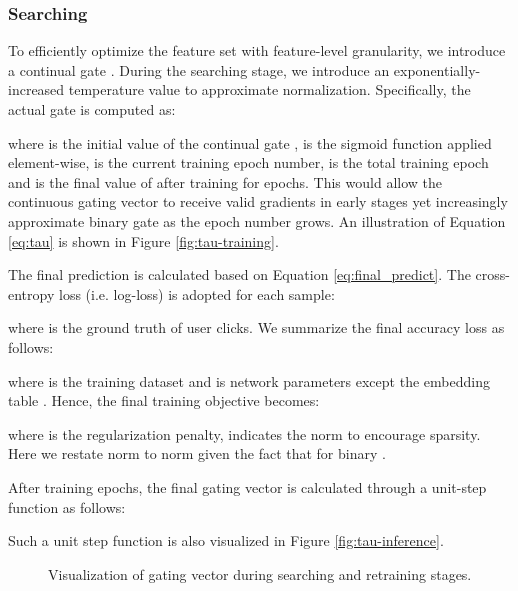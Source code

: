 \documentclass[sigconf]{acmart}
\begin{document}
\subsubsection{Searching}
To efficiently optimize the feature set with feature-level granularity, we introduce a continual gate . During the searching stage, we introduce an exponentially-increased temperature value  to approximate  normalization. Specifically, the actual gate  is computed as:

where  is the initial value of the continual gate ,  is the sigmoid function  applied element-wise,  is the current training epoch number,  is the total training epoch and  is the final value of  after training for  epochs. This would allow the continuous gating vector  to receive valid gradients in early stages yet increasingly approximate binary gate as the epoch number  grows. An illustration of Equation \ref{eq:tau} is shown in Figure \ref{fig:tau-training}.

The final prediction is calculated based on Equation \ref{eq:final_predict}. The cross-entropy loss (i.e. log-loss) is adopted for each sample:

where  is the ground truth of user clicks. We summarize the final accuracy loss as follows:

where  is the training dataset and  is network parameters except the embedding table . Hence, the final training objective becomes:

where  is the regularization penalty,  indicates the  norm to encourage sparsity. Here we restate  norm to  norm given the fact that  for binary .

After training  epochs, the final gating vector  is calculated through a unit-step function as follows:

Such a unit step function is also visualized in Figure \ref{fig:tau-inference}.

\begin{figure}[!htbp]
    \centering
    \vspace{-10pt}
    \caption{Visualization of gating vector  during searching and retraining stages.}
    \vspace{-5pt}
    \label{fig:tau}
\end{figure}
\end{document}
